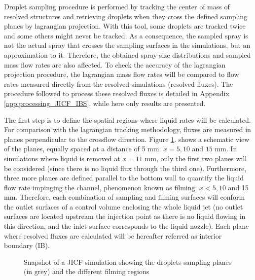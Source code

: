 Droplet sampling procedure is performed by tracking the center of mass of resolved structures and retrieving droplets when they cross the defined sampling planes by lagrangian projection. With this tool, some droplets are tracked twice and some others might never be tracked. As a consequence, the sampled spray is not the actual spray that crosses the sampling surfaces in the simulations, but an approximation to it. Therefore, the obtained spray size distributions and sampled mass flow rates are also affected. To check the accuracy of the lagrangian projection procedure, the lagrangian mass flow rates will be compared to flow rates measured directly from the resolved simulations (resolved fluxes). The procedure followed to process these resolved fluxes is detailed in Appendix \ref{app:processing_JICF_IBS}, while here only results are presented. 

The first step is to define the spatial regions where liquid rates will be calculated. For comparison with the lagrangian tracking methodology, fluxes are measured in planes perpendicular to the crossflow direction. Figure \ref{fig:jicf_interior_boundaries_surface_measurements}.  shows a schematic view of the planes, equally spaced at a distance of 5 mm: $x = 5, 10$ and $15$ mm. In simulations where liquid is removed at $x = 11$ mm, only the first two planes will be considered (since there is  no liquid flux through the third one). Furthermore, three more planes are defined parallel to the bottom wall to quantify the liquid flow rate impinging the channel, phenomenon known as filming: $x < 5, 10$ and 15 mm. Therefore, each combination of sampling and filming surfaces will conform the outlet surfaces of a control volume enclosing the whole liquid jet (no outlet surfaces are located upstream the injection point as there is no liquid flowing in this direction, and the inlet surface corresponds to the liquid
nozzle). Each plane where resolved fluxes are calculated will be hereafter referred as interior boundary (IB).

\clearpage

\begin{figure}[ht]
     \centering
     \caption{Snapshot of a JICF simulation showing the droplets sampling planes (in grey) and the different filming regions}
      \label{fig:jicf_interior_boundaries_surface_measurements}
\end{figure}

